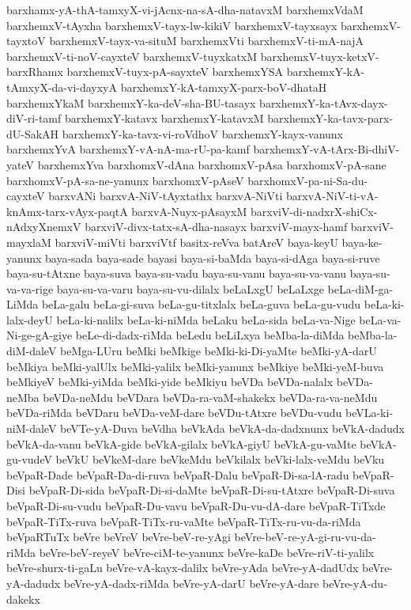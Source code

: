 {barxhamx-yA-thA-tamxyX-vi-jAcnx-na-sA-dha-natavxM
barxhemxVdaM
barxhemxV-tAyxha
barxhemxV-tayx-lw-kikiV
barxhemxV-tayxsayx
barxhemxV-tayxtoV
barxhemxV-tayx-va-situM
barxhemxVti
barxhemxV-ti-mA-najA
barxhemxV-ti-noV-cayxteV
barxhemxV-tuyxkatxM
barxhemxV-tuyx-ketxV-barxRhamx
barxhemxV-tuyx-pA-sayxteV
barxhemxYSA
barxhemxY-kA-tAmxyX-da-vi-dayxyA
barxhemxY-kA-tamxyX-parx-boV-dhataH
barxhemxYkaM
barxhemxY-ka-deV-sha-BU-tasayx
barxhemxY-ka-tAvx-dayx-diV-ri-tamf
barxhemxY-katavx
barxhemxY-katavxM
barxhemxY-ka-tavx-parx-dU-SakAH
barxhemxY-ka-tavx-vi-roVdhoV
barxhemxY-kayx-vanunx
barxhemxYvA
barxhemxY-vA-nA-ma-rU-pa-kamf
barxhemxY-vA-tArx-Bi-dhiV-yateV
barxhemxYva
barxhomxV-dAna
barxhomxV-pAsa
barxhomxV-pA-sane
barxhomxV-pA-sa-ne-yanunx
barxhomxV-pAseV
barxhomxV-pa-ni-Sa-du-cayxteV
barxvANi
barxvA-NiV-tAyxtathx
barxvA-NiVti
barxvA-NiV-ti-vA-knAmx-tarx-vAyx-paqtA
barxvA-Nuyx-pAsayxM
barxviV-di-nadxrX-shiCx-nAdxyXnemxV
barxviV-divx-tatx-sA-dha-nasayx
barxviV-mayx-hamf
barxviV-mayxlaM
barxviV-miVti
barxviVtf
basitx-reVva
batAreV
baya-keyU
baya-ke-yanunx
baya-sada
baya-sade
bayasi
baya-si-baMda
baya-si-dAga
baya-si-ruve
baya-su-tAtxne
baya-suva
baya-su-vadu
baya-su-vanu
baya-su-va-vanu
baya-su-va-va-rige
baya-su-va-varu
baya-su-vu-dilalx
beLaLxgU
beLaLxge
beLa-diM-ga-LiMda
beLa-galu
beLa-gi-suva
beLa-gu-titxlalx
beLa-guva
beLa-gu-vudu
beLa-ki-lalx-deyU
beLa-ki-nalilx
beLa-ki-niMda
beLaku
beLa-sida
beLa-va-Nige
beLa-va-Ni-ge-gA-giye
beLe-di-dadx-riMda
beLedu
beLiLxya
beMba-la-diMda
beMba-la-diM-daleV
beMga-LUru
beMki
beMkige
beMki-ki-Di-yaMte
beMki-yA-darU
beMkiya
beMki-yalUlx
beMki-yalilx
beMki-yanunx
beMkiye
beMki-yeM-buva
beMkiyeV
beMki-yiMda
beMki-yide
beMkiyu
beVDa
beVDa-nalalx
beVDa-neMba
beVDa-neMdu
beVDara
beVDa-ra-vaM-shakekx
beVDa-ra-va-neMdu
beVDa-riMda
beVDaru
beVDa-veM-dare
beVDu-tAtxre
beVDu-vudu
beVLa-ki-niM-daleV
beVTe-yA-Duva
beVdha
beVkAda
beVkA-da-dadxnunx
beVkA-dadudx
beVkA-da-vanu
beVkA-gide
beVkA-gilalx
beVkA-giyU
beVkA-gu-vaMte
beVkA-gu-vudeV
beVkU
beVkeM-dare
beVkeMdu
beVkilalx
beVki-lalx-veMdu
beVku
beVpaR-Dade
beVpaR-Da-di-ruva
beVpaR-Dalu
beVpaR-Di-sa-lA-radu
beVpaR-Disi
beVpaR-Di-sida
beVpaR-Di-si-daMte
beVpaR-Di-su-tAtxre
beVpaR-Di-suva
beVpaR-Di-su-vudu
beVpaR-Du-vavu
beVpaR-Du-vu-dA-dare
beVpaR-TiTxde
beVpaR-TiTx-ruva
beVpaR-TiTx-ru-vaMte
beVpaR-TiTx-ru-vu-da-riMda
beVpaRTuTx
beVre
beVreV
beVre-beV-re-yAgi
beVre-beV-re-yA-gi-ru-vu-da-riMda
beVre-beV-reyeV
beVre-ciM-te-yanunx
beVre-kaDe
beVre-riV-ti-yalilx
beVre-shurx-ti-gaLu
beVre-vA-kayx-dalilx
beVre-yAda
beVre-yA-dadUdx
beVre-yA-dadudx
beVre-yA-dadx-riMda
beVre-yA-darU
beVre-yA-dare
beVre-yA-du-dakekx
}
